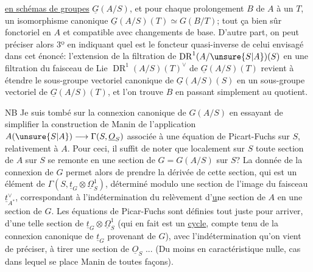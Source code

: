\uline{en schémas de groupes}  $\underline{G}(A/S)$, et pour chaque prolongement  $B$ de $A$ à un $T$, un isomorphisme canonique $\underline{G}(A/S)(T)\simeq G(B/T)$; tout ça bien sûr fonctoriel en $A$ et compatible avec changements de base. D'autre part, on peut préciser alors 3º en indiquant quel est le foncteur quasi-inverse de celui envisagé dans cet énoncé: l'extension de la filtration de $\operatorname{DR}^1(A/\unsure{S|A})(S)$ en une filtration du faisceau de Lie $\operatorname{DR}^1(A/S)(T)^{\vee}$ de $\underline{G}(A/S)(T)$ revient à étendre le sous-groupe vectoriel canonique de $\underline{G}(A/S)(S)$ en un sous-groupe vectoriel de $\underline{G}(A/S)(T)$, et l'on trouve $B$ en passant simplement au quotient.

NB Je suis tombé sur la connexion canonique de $G(A/S)$ en essayant de simplifier la construction de Manin de l'application $A(\unsure{S|A})\longrightarrow\Gamma(S,\underline{O}_S)$ associée à une équation de Picart-Fuchs sur $S$, relativement à $A$. Pour ceci, il suffit de noter que localement sur $S$ toute section de $A$ sur $S$ se remonte en une section de $G=G(A/S)$ sur $S$? La donnée de la connexion de $G$ permet alors de prendre la dérivée de cette section, qui est un élément de $\Gamma(S,\underline{t}_G\otimes\underline{\Omega}^1_S)$, déterminé modulo une section de l'image du faisceau $\underline{t}^{\vee}_{A^*}$, correspondant à l'indétermination du relèvement d'\uline{u}ne section de $A$ en une section de $G$. Les équations de Picar-Fuchs sont définies tout juste pour arriver, d'une telle section de  $\underline{t}_G\otimes\underline{\Omega}^1_S$ (qui en fait est un \uline{cycle}, compte tenu de la connexion canonique de $\underline{t}_G$ provenant de $G$), avec l'indétermination qu'on vient de préciser, à tirer une section de $\underline{O}_S$ ... (Du moins en caractéristique nulle, cas dans lequel se place Manin de toutes façons).
